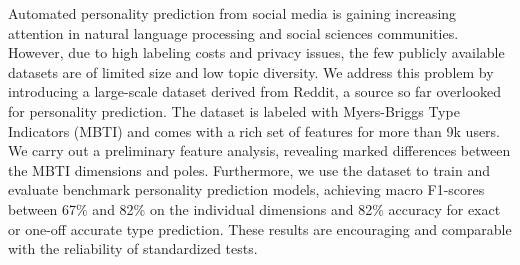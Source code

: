 Automated personality prediction from social media is gaining increasing attention in natural language processing and social sciences communities. However, due to high labeling costs and privacy issues, the few publicly available datasets are of limited size and low topic diversity. We address this problem by introducing a large-scale dataset derived from Reddit, a source so far overlooked for personality prediction. The dataset is labeled with Myers-Briggs Type Indicators (MBTI) and comes with a rich set of features for more than 9k users. We carry out a preliminary feature analysis, revealing marked differences between the MBTI dimensions and poles. Furthermore, we use the dataset to train and evaluate benchmark personality prediction models, achieving macro F1-scores between 67\% and 82\% on the individual dimensions and 82\% accuracy for exact or one-off accurate type prediction. These results are encouraging and comparable with the reliability of standardized tests.
